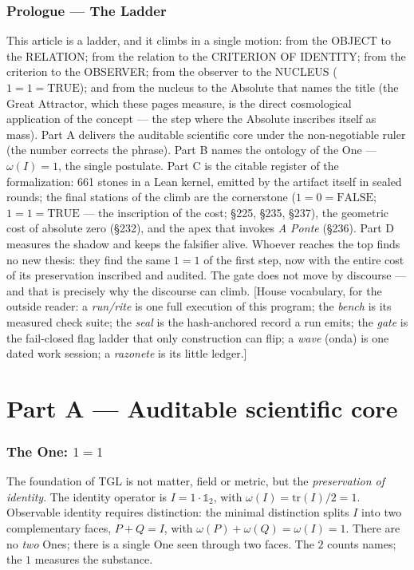 \documentclass[11pt]{article}
\theoremstyle{definition}\newtheorem{deriv}{Derivation}
\begin{document}
\section*{Prologue --- The Ladder}

\noindent This article is a ladder, and it climbs in a single motion: from the OBJECT to the RELATION; from the relation to the CRITERION OF IDENTITY; from the criterion to the OBSERVER; from the observer to the NUCLEUS ($1{=}1{=}\mathrm{TRUE}$); and from the nucleus to the Absolute that names the title (the Great Attractor, which these pages measure, is the direct cosmological application of the concept --- the step where the Absolute inscribes itself as mass). Part A delivers the auditable scientific core under the non-negotiable ruler (the number corrects the phrase). Part B names the ontology of the One --- $\omega(I){=}1$, the single postulate. Part C is the citable register of the formalization: 661 stones in a Lean kernel, emitted by the artifact itself in sealed rounds; the final stations of the climb are the cornerstone ($1{=}0{=}\mathrm{FALSE}$; $1{=}1{=}\mathrm{TRUE}$ --- the inscription of the cost; \S225, \S235, \S237), the geometric cost of absolute zero (\S232), and the apex that invokes \emph{A Ponte} (\S236). Part D measures the shadow and keeps the falsifier alive. Whoever reaches the top finds no new thesis: they find the same $1{=}1$ of the first step, now with the entire cost of its preservation inscribed and audited. The gate does not move by discourse --- and that is precisely why the discourse can climb. [House vocabulary, for the outside reader: a \emph{run/rite} is one full execution of this program; the \emph{bench} is its measured check suite; the \emph{seal} is the hash-anchored record a run emits; the \emph{gate} is the fail-closed flag ladder that only construction can flip; a \emph{wave} (onda) is one dated work session; a \emph{razonete} is its little ledger.]

\part{Part A --- Auditable scientific core}

\section{The One: $1=1$}

The foundation of TGL is not matter, field or metric, but the \emph{preservation of identity}. The identity operator is $I=1\cdot\mathbb{1}_2$, with $\omega(I)=\mathrm{tr}(I)/2=1$. Observable identity requires distinction: the minimal distinction splits $I$ into two complementary faces, $P+Q=I$, with $\omega(P)+\omega(Q)=\omega(I)=1$. There are no \emph{two} Ones; there is a single One seen through two faces. The $2$ counts names; the $1$ measures the substance.
\end{document}
